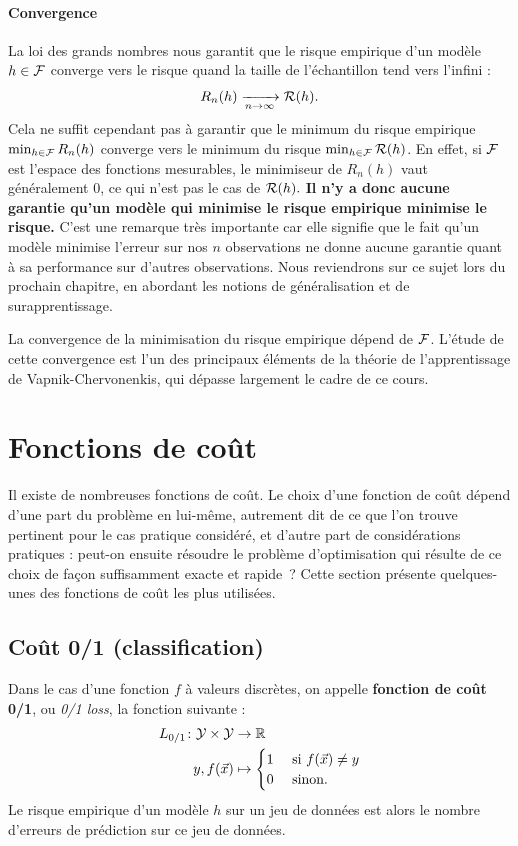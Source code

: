 \paragraph{Convergence} La loi des grands nombres nous garantit que le risque
empirique d'un modèle $h \in \mathcal{F}$ converge vers le risque quand la taille de
l'échantillon tend vers l'infini :
\begin{equation}
  \label{eq:risk_cvg}
  R_n(h) \xrightarrow[n \to \infty]{} \mathcal{R}(h).
\end{equation}
Cela ne suffit cependant pas à garantir que le minimum du risque empirique
$\min_{h \in \mathcal{F}} R_n(h)$ converge vers le minimum du risque
$\min_{h \in \mathcal{F}} \mathcal{R}(h)$. En effet, si $\mathcal{F}$ est l'espace des fonctions
mesurables, le minimiseur de $R_n(h)$ vaut généralement $0$, ce qui n'est pas
le cas de $\mathcal{R}(h).$ \textbf{Il n'y a donc aucune garantie qu'un modèle qui
  minimise le risque empirique minimise le risque.} C'est une remarque très
importante car elle signifie que le fait qu'un modèle minimise l'erreur sur nos
$n$ observations ne donne aucune garantie quant à sa performance sur d'autres
observations. Nous reviendrons sur ce sujet lors du prochain chapitre, en abordant
les notions de généralisation et de surapprentissage.

La convergence de la minimisation du risque empirique dépend de $\mathcal{F}$. L'étude
de cette convergence est l'un des principaux éléments de la théorie de
l'apprentissage de Vapnik-Chervonenkis, qui dépasse largement le cadre de ce
cours.


\section{Fonctions de coût}
\label{sec:losses}
Il existe de nombreuses fonctions de coût. Le choix d'une fonction de coût
dépend d'une part du problème en lui-même, autrement dit de ce que l'on trouve
pertinent pour le cas pratique considéré, et d'autre part de considérations
pratiques : peut-on ensuite résoudre le problème d'optimisation qui résulte de
ce choix de façon suffisamment exacte et rapide~?
Cette section présente quelques-unes des fonctions de coût les plus utilisées.

\subsection{Coût 0/1 (classification)}
Dans le cas d'une fonction $f$ à valeurs discrètes, on appelle \textbf{fonction
  de coût 0/1}, ou {\it 0/1 loss}, la fonction suivante :
\begin{align*}
  L_{0/1}\colon\YY \times \YY & \to \RR \\
  y, f(\xx) & \mapsto
              \begin{cases}
                1 & \mbox{ si } f(\xx) \neq y \\
                0 & \mbox{ sinon.}
              \end{cases}
\end{align*}
Le risque empirique d'un modèle $h$ sur un jeu de données est alors le nombre
d'erreurs de prédiction sur ce jeu de données.


